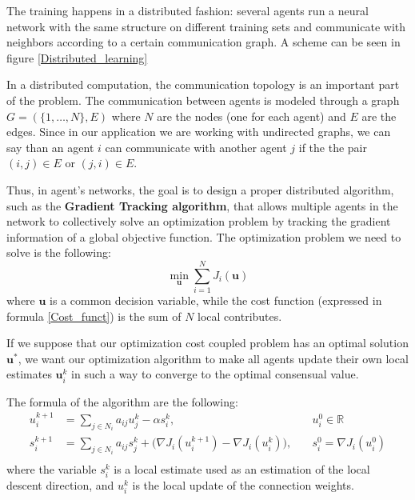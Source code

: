 \documentclass[a4paper,11pt,oneside]{book}
\begin{document}
The training happens in a distributed fashion: several agents run a neural network with the same structure on different training sets and communicate with neighbors according to a certain communication graph. A scheme can be seen in figure \ref{Distributed_learning}

\bigskip
In a distributed computation, the communication topology is an important part of the problem. The communication between agents is modeled through a graph $G = (\{1, \ldots,N\}, E)$ where $N$ are the nodes (one for each agent) and $E$ are the edges. Since in our application we are working with undirected graphs, we can say than an agent $i$ can communicate with another agent $j$ if the the pair $(i,j) \in E$ or $(j,i) \in E$.

\bigskip
Thus, in agent's networks, the goal is to design a proper distributed algorithm, such as the \textbf{Gradient Tracking algorithm}, that allows multiple agents in the network to collectively solve an optimization problem by tracking the gradient information of a global objective function.
The optimization problem we need to solve is the following:
\begin{equation}
\min_{\textbf{u}} \sum_{i=1}^N J_i(\textbf{u})
\end{equation}
where $\textbf{u}$ is a common decision variable, while the cost function (expressed in formula \ref{Cost_funct}) is the sum of $N$ local contributes.

\bigskip
If we suppose that our optimization cost coupled problem has an optimal solution $\textbf{u}^*$, we want our optimization algorithm to make all agents update their own local estimates $\textbf{u}_i^k$ in such a way to converge to the optimal consensual value.

The formula of the algorithm are the following:
\begin {equation}
\begin{aligned}
u_i^{k+1} &= \sum_{j \in N_i} a_{ij} u_j^k - \alpha s_i^k, \quad & u_i^0 \in \mathbb{R}\\
s_i^{k+1}   &= \sum_{j \in N_i} a_{ij} s_j^k + \big( \nabla J_i(u_i^{k+1}) - \nabla J_i(u_i^k)\big) , \quad & s_i^0 = \nabla J_i(u_i^0) \\
\end{aligned}
\end{equation}
where the variable $s_i^k$ is a local estimate used as an estimation of the local descent direction, and $u_i^k$ is the local update of the connection weights. 
\end{document}
